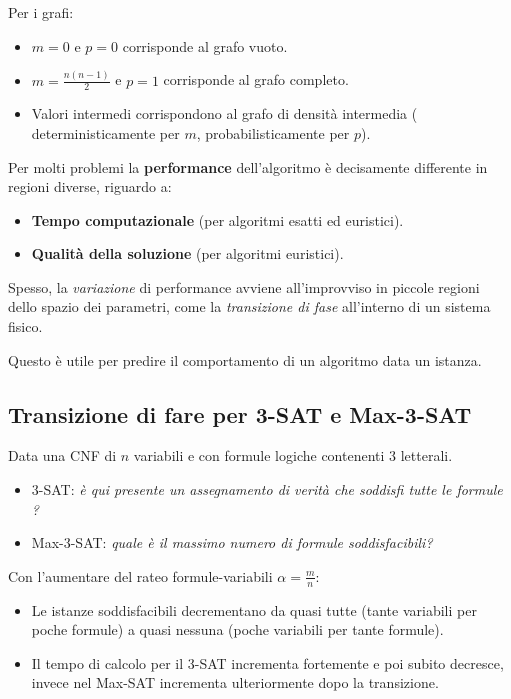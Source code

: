 \documentclass{article}
\begin{document}
Per i grafi:
\begin{itemize}
    \item $m=0$ e $p=0$ corrisponde al grafo vuoto.
    \item $m=\frac{n(n-1)}{2}$ e $p=1$ corrisponde al grafo completo.
    \item Valori intermedi corrispondono al grafo di densità intermedia (
          deterministicamente per $m$, probabilisticamente per $p$).
\end{itemize}

Per molti problemi la \textbf{performance} dell'algoritmo è decisamente differente
in regioni diverse, riguardo a:
\begin{itemize}
    \item \textbf{Tempo computazionale} (per algoritmi esatti ed euristici).
    \item \textbf{Qualità della soluzione} (per algoritmi euristici).
\end{itemize}

Spesso, la \textit{variazione} di performance avviene all'improvviso in piccole
regioni dello spazio dei parametri, come la \textit{transizione di fase} all'interno
di un sistema fisico.

Questo è utile per predire il comportamento di un algoritmo data un istanza.
\subsection{Transizione di fare per 3-SAT e Max-3-SAT}
Data una CNF di $n$ variabili e con formule logiche contenenti $3$ letterali.

\begin{itemize}
    \item 3-SAT: \textit{è qui presente un assegnamento di verità che soddisfi tutte le formule ?}
    \item Max-3-SAT: \textit{quale è il massimo numero di formule soddisfacibili?}
\end{itemize}

Con l'aumentare del rateo formule-variabili $\alpha=\frac{m}{n}$:
\begin{itemize}
    \item Le istanze soddisfacibili decrementano da quasi tutte (tante variabili
          per poche formule) a quasi nessuna (poche variabili per tante formule).
    \item Il tempo di calcolo per il 3-SAT incrementa fortemente e poi subito
          decresce, invece nel Max-SAT incrementa ulteriormente dopo la transizione.
\end{itemize}
\end{document}
